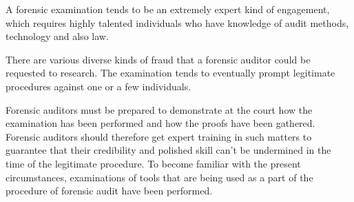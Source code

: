 A forensic examination tends to be an extremely expert kind of engagement, which requires highly talented individuals who have knowledge of audit methods, technology and also law. 

There are various diverse kinds of fraud that a forensic auditor could be requested to research. The examination tends to eventually prompt legitimate procedures against one or a few individuals.

Forensic auditors must be prepared to demonstrate at the court how the examination has been  performed and how the proofs have been gathered. Forensic auditors should therefore get expert training in such matters to guarantee that their credibility and polished skill can't be undermined in the time of the legitimate procedure. To become familiar with the present circumstances, examinations of tools that are being used as a part of the procedure of forensic audit have been performed. 


